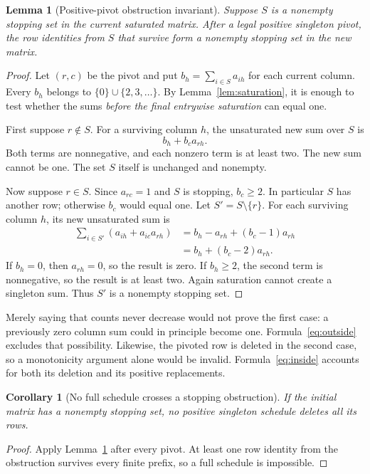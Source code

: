 \documentclass[11pt]{article}
\newtheorem{lemma}[theorem]{Lemma}
\newtheorem{corollary}[theorem]{Corollary}
\theoremstyle{definition}\newtheorem{definition}[theorem]{Definition}
\theoremstyle{remark}\newtheorem{remark}[theorem]{Remark}
\begin{document}
\begin{lemma}[Positive-pivot obstruction invariant]
\label{lem:invariant}
Suppose $S$ is a nonempty stopping set in the current saturated matrix. After a legal positive singleton pivot, the row identities from $S$ that survive form a nonempty stopping set in the new matrix.
\end{lemma}
\begin{proof}
Let $(r,c)$ be the pivot and put $b_h=\sum_{i\in S}a_{ih}$ for each current column. Every $b_h$ belongs to $\{0\}\cup\{2,3,\ldots\}$. By Lemma~\ref{lem:saturation}, it is enough to test whether the sums \emph{before the final entrywise saturation} can equal one.

First suppose $r\notin S$. For a surviving column $h$, the unsaturated new sum over $S$ is
\begin{equation}
 b_h+b_c a_{rh}.
 \label{eq:outside}
\end{equation}
Both terms are nonnegative, and each nonzero term is at least two. The new sum cannot be one. The set $S$ itself is unchanged and nonempty.

Now suppose $r\in S$. Since $a_{rc}=1$ and $S$ is stopping, $b_c\geq2$. In particular $S$ has another row; otherwise $b_c$ would equal one. Let $S'=S\setminus\{r\}$. For each surviving column $h$, its new unsaturated sum is
\begin{align}
 \sum_{i\in S'}(a_{ih}+a_{ic}a_{rh})
 &=b_h-a_{rh}+(b_c-1)a_{rh}\\
 &=b_h+(b_c-2)a_{rh}.
 \label{eq:inside}
\end{align}
If $b_h=0$, then $a_{rh}=0$, so the result is zero. If $b_h\geq2$, the second term is nonnegative, so the result is at least two. Again saturation cannot create a singleton sum. Thus $S'$ is a nonempty stopping set.
\end{proof}

Merely saying that counts never decrease would not prove the first case: a previously zero column sum could in principle become one. Formula~\eqref{eq:outside} excludes that possibility. Likewise, the pivoted row is deleted in the second case, so a monotonicity argument alone would be invalid. Formula~\eqref{eq:inside} accounts for both its deletion and its positive replacements.

\begin{corollary}[No full schedule crosses a stopping obstruction]
\label{cor:obstruction}
If the initial matrix has a nonempty stopping set, no positive singleton schedule deletes all its rows.
\end{corollary}
\begin{proof}
Apply Lemma~\ref{lem:invariant} after every pivot. At least one row identity from the obstruction survives every finite prefix, so a full schedule is impossible.
\end{proof}
\end{document}
